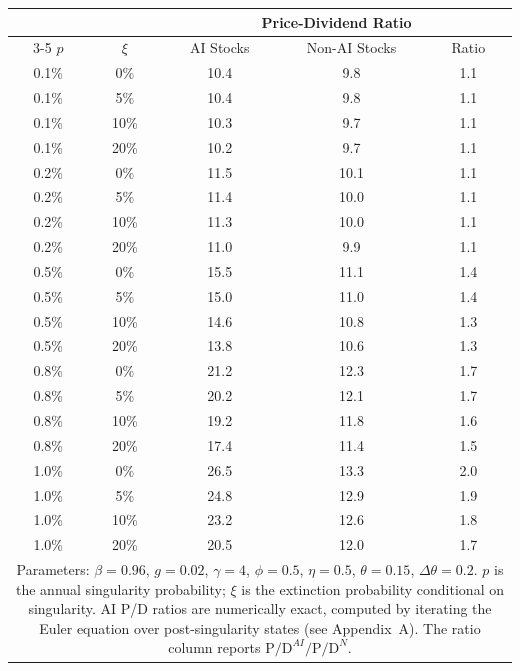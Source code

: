 \begin{tabular}{cc ccc}
\toprule
 & & \multicolumn{3}{c}{Price-Dividend Ratio} \\
\cmidrule(lr){3-5}
$p$ & $\xi$ & AI Stocks & Non-AI Stocks & Ratio \\
\midrule
0.1\% & 0\% & 10.4 & 9.8 & 1.1 \\
0.1\% & 5\% & 10.4 & 9.8 & 1.1 \\
0.1\% & 10\% & 10.3 & 9.7 & 1.1 \\
0.1\% & 20\% & 10.2 & 9.7 & 1.1 \\
\midrule
0.2\% & 0\% & 11.5 & 10.1 & 1.1 \\
0.2\% & 5\% & 11.4 & 10.0 & 1.1 \\
0.2\% & 10\% & 11.3 & 10.0 & 1.1 \\
0.2\% & 20\% & 11.0 & 9.9 & 1.1 \\
\midrule
0.5\% & 0\% & 15.5 & 11.1 & 1.4 \\
0.5\% & 5\% & 15.0 & 11.0 & 1.4 \\
0.5\% & 10\% & 14.6 & 10.8 & 1.3 \\
0.5\% & 20\% & 13.8 & 10.6 & 1.3 \\
\midrule
0.8\% & 0\% & 21.2 & 12.3 & 1.7 \\
0.8\% & 5\% & 20.2 & 12.1 & 1.7 \\
0.8\% & 10\% & 19.2 & 11.8 & 1.6 \\
0.8\% & 20\% & 17.4 & 11.4 & 1.5 \\
\midrule
1.0\% & 0\% & 26.5 & 13.3 & 2.0 \\
1.0\% & 5\% & 24.8 & 12.9 & 1.9 \\
1.0\% & 10\% & 23.2 & 12.6 & 1.8 \\
1.0\% & 20\% & 20.5 & 12.0 & 1.7 \\
\bottomrule
\multicolumn{5}{p{0.85\textwidth}}{\footnotesize Parameters: $\beta=0.96$, $g=0.02$, $\gamma=4$, $\phi=0.5$, $\eta=0.5$, $\theta=0.15$, $\Delta\theta=0.2$. $p$ is the annual singularity probability; $\xi$ is the extinction probability conditional on singularity. AI P/D ratios are numerically exact, computed by iterating the Euler equation over post-singularity states (see Appendix~A). The ratio column reports $\text{P/D}^{AI} / \text{P/D}^{N}$.} \\
\end{tabular}
